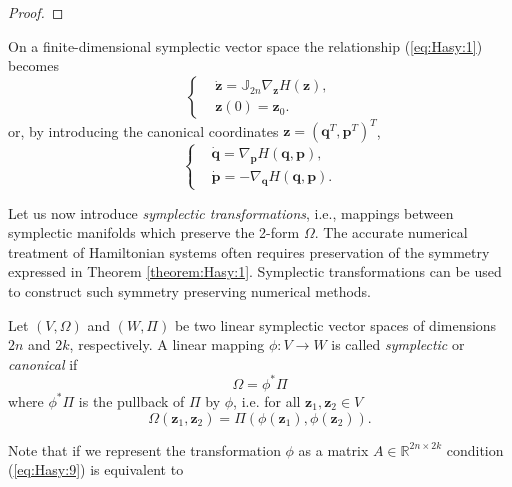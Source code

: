 {\begin{proof}
\end{proof}
\begin{theorem} \label{theorem:Hasy:1.7} \cite{Marsden:1999ck}
On a finite-dimensional symplectic vector space the relationship (\ref{eq:Hasy:1}) becomes 
\begin{equation} \label{eq:Hasy:7}
\left\{
\begin{aligned}
	&\dot {\mathbf z} = \mathbb{J}_{2n} \nabla_{\mathbf z} H(\mathbf z), \\
	& \mathbf z(0) = \mathbf z_0.
\end{aligned}
\right.
\end{equation}
or, by introducing the canonical coordinates $\mathbf z = (\mathbf q^T, \mathbf p^T)^T$,
\begin{equation} \label{eq:Hasy:8}
\left\{
\begin{aligned}
	&\dot {\mathbf q} = \nabla_{\mathbf p} H(\mathbf q,\mathbf p),\\
	&\dot {\mathbf p} = - \nabla_{\mathbf q} H(\mathbf q,\mathbf p).
\end{aligned}
\right.
\end{equation}
\end{theorem}
}

{\edit Let} us now introduce \emph{symplectic transformations}, i.e., mappings between symplectic manifolds which preserve the 2-form $\Omega$. The accurate numerical treatment of Hamiltonian systems often requires preservation of the symmetry expressed in Theorem \ref{theorem:Hasy:1}. Symplectic transformations can be used to construct such symmetry preserving numerical methods. 

{\edit
\begin{definition}
Let $(V,\Omega)$ and $(W,\Pi)$ be two linear symplectic vector spaces of dimensions $2n$ and $2k$, respectively. A linear mapping $\phi:V \to W$ is called \emph{symplectic} or \emph{canonical} if
\begin{equation} \label{eq:Hasy:9}
	\Omega = \phi^* \Pi
\end{equation}
where $\phi^* \Pi$ is the pullback of $\Pi$ by $\phi$, i.e. for all $\mathbf{z}_1, \mathbf{z}_2\in V$
\begin{equation}
	\Omega(\mathbf{z}_1,\mathbf{z}_2) = \Pi(\phi(\mathbf{z}_1),\phi(\mathbf{z}_2)).
\end{equation}
\end{definition}

Note that if we represent the transformation $\phi$ as a matrix $A\in \mathbb R^{2n\times 2k}$ condition (\ref{eq:Hasy:9}) is equivalent to \cite{Marsden:1999ck}}

